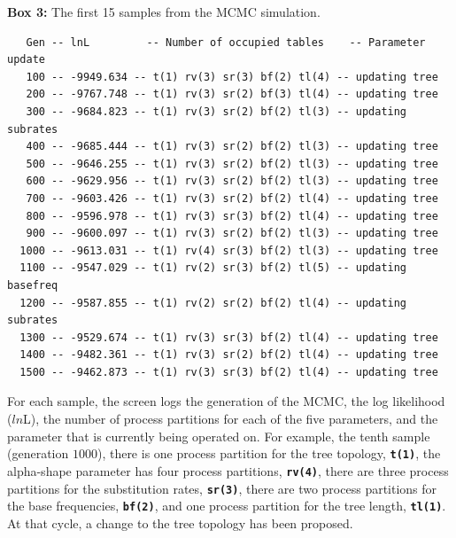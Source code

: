 \documentclass[11pt]{article}
\newcommand{\cl}[1]{{\texttt{\textbf{#1}}}}
\begin{document}
\begin{center}
{\bf Box 3:} The first 15 samples from the MCMC simulation. \\
\end{center}
{\tt \scriptsize \begin{framed}
\begin{lstlisting}
   Gen -- lnL         -- Number of occupied tables    -- Parameter update
   100 -- -9949.634 -- t(1) rv(3) sr(3) bf(2) tl(4) -- updating tree
   200 -- -9767.748 -- t(1) rv(3) sr(2) bf(3) tl(4) -- updating tree
   300 -- -9684.823 -- t(1) rv(3) sr(2) bf(2) tl(3) -- updating subrates
   400 -- -9685.444 -- t(1) rv(3) sr(2) bf(2) tl(3) -- updating tree
   500 -- -9646.255 -- t(1) rv(3) sr(2) bf(2) tl(3) -- updating tree
   600 -- -9629.956 -- t(1) rv(3) sr(2) bf(2) tl(3) -- updating tree
   700 -- -9603.426 -- t(1) rv(3) sr(2) bf(2) tl(4) -- updating tree
   800 -- -9596.978 -- t(1) rv(3) sr(3) bf(2) tl(4) -- updating tree
   900 -- -9600.097 -- t(1) rv(3) sr(2) bf(2) tl(3) -- updating tree
  1000 -- -9613.031 -- t(1) rv(4) sr(3) bf(2) tl(3) -- updating tree
  1100 -- -9547.029 -- t(1) rv(2) sr(3) bf(2) tl(5) -- updating basefreq
  1200 -- -9587.855 -- t(1) rv(2) sr(2) bf(2) tl(4) -- updating subrates
  1300 -- -9529.674 -- t(1) rv(3) sr(3) bf(2) tl(4) -- updating tree
  1400 -- -9482.361 -- t(1) rv(3) sr(2) bf(2) tl(4) -- updating tree
  1500 -- -9462.873 -- t(1) rv(3) sr(3) bf(2) tl(4) -- updating tree
\end{lstlisting}
\end{framed}}

For each sample, the screen logs the generation of the MCMC, the log likelihood ($ln$L), the number of process partitions for each of the five parameters, and the parameter that is currently being operated on.
For example, the tenth sample (generation $1000$), there is one process partition for the tree topology, \cl{t(1)}, the alpha-shape parameter has four process partitions, \cl{rv(4)}, there are three process partitions for the  substitution rates, \cl{sr(3)}, there are two process partitions for the base frequencies, \cl{bf(2)}, and one process partition for the tree length, \cl{tl(1)}.
At that cycle, a change to the tree topology has been proposed.
\end{document}
